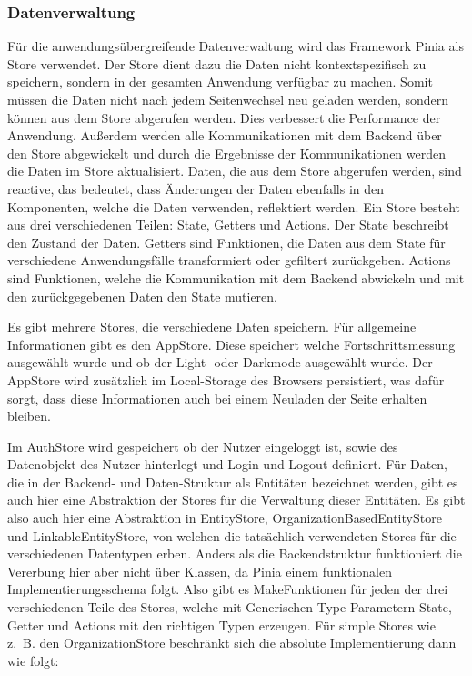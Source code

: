 \subsubsection{Datenverwaltung}
Für die anwendungsübergreifende Datenverwaltung wird das Framework Pinia als Store verwendet. Der Store dient dazu die Daten nicht kontextspezifisch zu speichern, sondern in der gesamten Anwendung verfügbar zu machen. Somit müssen die Daten nicht nach jedem Seitenwechsel neu geladen werden, sondern können aus dem Store abgerufen werden. Dies verbessert die Performance der Anwendung. Außerdem werden alle Kommunikationen mit dem Backend über den Store abgewickelt und durch die Ergebnisse der Kommunikationen werden die Daten im Store aktualisiert. Daten, die aus dem Store abgerufen werden, sind reactive, das bedeutet, dass Änderungen der Daten ebenfalls in den Komponenten, welche die Daten verwenden, reflektiert werden. Ein Store besteht aus drei verschiedenen Teilen: State, Getters und Actions. Der State beschreibt den Zustand der Daten. Getters sind Funktionen, die Daten aus dem State für verschiedene Anwendungsfälle transformiert oder gefiltert zurückgeben. Actions sind Funktionen, welche die Kommunikation mit dem Backend abwickeln und mit den zurückgegebenen Daten den State mutieren.

Es gibt mehrere Stores, die verschiedene Daten speichern. Für allgemeine Informationen gibt es den AppStore. Diese speichert welche Fortschrittsmessung ausgewählt wurde und ob der Light- oder Darkmode ausgewählt wurde. Der AppStore wird zusätzlich im Local-Storage des Browsers persistiert, was dafür sorgt, dass diese Informationen auch bei einem Neuladen der Seite erhalten bleiben.

Im AuthStore wird gespeichert ob der Nutzer eingeloggt ist, sowie des Datenobjekt des Nutzer hinterlegt und Login und Logout definiert.
Für Daten, die in der Backend- und Daten-Struktur als Entitäten bezeichnet werden, gibt es auch hier eine Abstraktion der Stores für die Verwaltung dieser Entitäten. Es gibt also auch hier eine Abstraktion in EntityStore, OrganizationBasedEntityStore und LinkableEntityStore, von welchen die tatsächlich verwendeten Stores für die verschiedenen Datentypen erben. Anders als die Backendstruktur funktioniert die Vererbung hier aber nicht über Klassen, da Pinia einem funktionalen Implementierungsschema folgt. Also gibt es MakeFunktionen für jeden der drei verschiedenen Teile des Stores, welche mit Generischen-Type-Parametern State, Getter und Actions mit den richtigen Typen erzeugen. Für simple Stores wie z. B. den OrganizationStore beschränkt sich die absolute Implementierung dann wie folgt:

